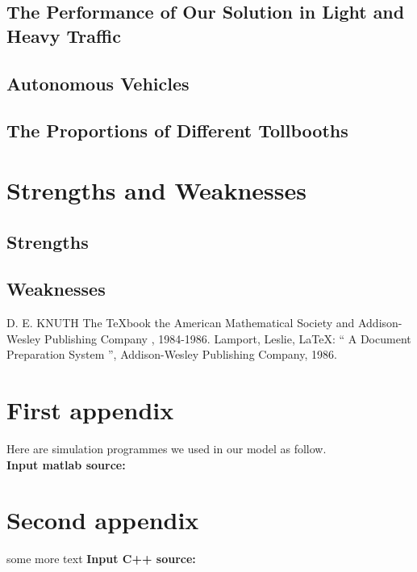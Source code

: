 \documentclass{mcmthesis}
\begin{document}
\subsection{The Performance of Our Solution in Light
and Heavy Traffic}
\subsection{Autonomous Vehicles}
\subsection{The Proportions of Different Tollbooths}

\section{Strengths and Weaknesses}
\subsection{Strengths}
\subsection{Weaknesses}

\begin{thebibliography}{99}
 D. E. KNUTH   The \TeX{}book  the American
Mathematical Society and Addison-Wesley
Publishing Company , 1984-1986.
Lamport, Leslie,  \LaTeX{}: `` A Document Preparation System '',
Addison-Wesley Publishing Company, 1986.

\end{thebibliography}

\begin{appendices}

\section{First appendix}


Here are simulation programmes we used in our model as follow.\\

\textbf{\textcolor[rgb]{0.98,0.00,0.00}{Input matlab source:}}


\section{Second appendix}

some more text \textcolor[rgb]{0.98,0.00,0.00}{\textbf{Input C++ source:}}


\end{appendices}
\end{document}
